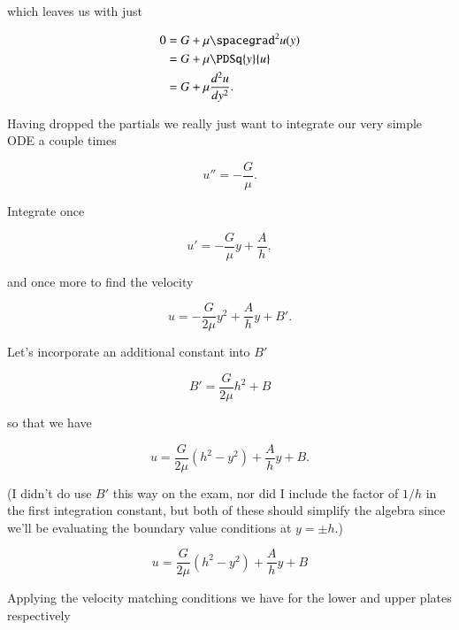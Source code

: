 \begin{itemize}
which leaves us with just

\begin{align*}
0 
&= G + \mu \spacegrad^2 u(y)  \\
&= G + \mu \PDSq{y}{u} \\
&= G + \mu \frac{d^2 u}{dy^2}.
\end{align*}

Having dropped the partials we really just want to integrate our very simple ODE a couple times

\begin{equation}\label{eqn:continuumMidTermReflection:430}
u'' = -\frac{G}{\mu}.
\end{equation}

Integrate once

\begin{equation}\label{eqn:continuumMidTermReflection:450}
u' = -\frac{G}{\mu} y + \frac{A}{h},
\end{equation}

and once more to find the velocity

\begin{equation}\label{eqn:continuumMidTermReflection:470}
u = -\frac{G}{2 \mu} y^2 + \frac{A}{h} y + B'.
\end{equation}

Let's incorporate an additional constant into $B'$

\begin{equation}\label{eqn:continuumMidTermReflection:490}
B' = \frac{G}{2 \mu} h^2 + B
\end{equation}

so that we have

\begin{equation}\label{eqn:continuumMidTermReflection:510}
u = \frac{G}{2 \mu} (h^2 - y^2) + \frac{A}{h} y + B.
\end{equation}

(I didn't do use $B'$ this way on the exam, nor did I include the factor of $1/h$ in the first integration constant, but both of these should simplify the algebra since we'll be evaluating the boundary value conditions at $y = \pm h$.)

\begin{equation}\label{eqn:continuumMidTermReflection:530}
u = \frac{G}{2 \mu} (h^2 - y^2) + \frac{A}{h} y + B
\end{equation}

Applying the velocity matching conditions we have for the lower and upper plates respectively


\end{itemize}
